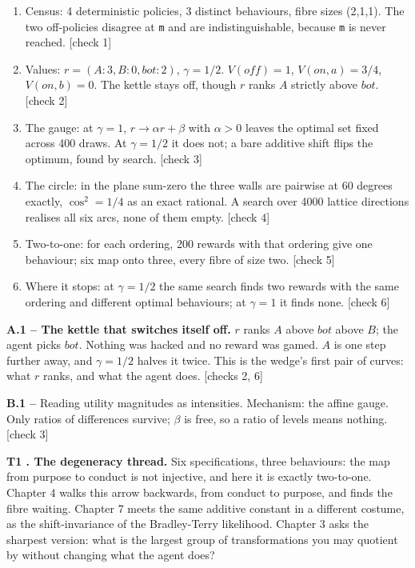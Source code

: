 \begin{enumerate}
\item Census: 4 deterministic policies, 3 distinct behaviours, fibre sizes (2,1,1). The two off-policies disagree at \texttt{m} and are indistinguishable, because \texttt{m} is never reached. [check 1]
\item Values: $r = (A:3, B:0, bot:2)$, $\gamma = 1/2$. $V(off) = 1$, $V(on,a) = 3/4$, $V(on,b) = 0$. The kettle stays off, though $r$ ranks $A$ strictly above $bot$. [check 2]
\item The gauge: at $\gamma = 1$, $r \to \alpha r + \beta$ with $\alpha > 0$ leaves the optimal set fixed across 400 draws. At $\gamma = 1/2$ it does not; a bare additive shift flips the optimum, found by search. [check 3]
\item The circle: in the plane sum-zero the three walls are pairwise at 60 degrees exactly, $\cos^2 = 1/4$ as an exact rational. A search over 4000 lattice directions realises all six arcs, none of them empty. [check 4]
\item Two-to-one: for each ordering, 200 rewards with that ordering give one behaviour; six map onto three, every fibre of size two. [check 5]
\item Where it stops: at $\gamma = 1/2$ the same search finds two rewards with the same ordering and different optimal behaviours; at $\gamma = 1$ it finds none. [check 6]
\end{enumerate}


\textbf{A.1 -- The kettle that switches itself off.} $r$ ranks $A$ above $bot$ above $B$; the agent picks $bot$. Nothing was hacked and no reward was gamed. $A$ is one step further away, and $\gamma = 1/2$ halves it twice. This is the wedge's first pair of curves: what $r$ ranks, and what the agent does. [checks 2, 6]

\textbf{B.1 --} Reading utility magnitudes as intensities. Mechanism: the affine gauge. Only ratios of differences survive; $\beta$ is free, so a ratio of levels means nothing. [check 3]

\textbf{T1 . The degeneracy thread.} Six specifications, three behaviours: the map from purpose to conduct is not injective, and here it is exactly two-to-one. Chapter 4 walks this arrow backwards, from conduct to purpose, and finds the fibre waiting. Chapter 7 meets the same additive constant in a different costume, as the shift-invariance of the Bradley-Terry likelihood. Chapter 3 asks the sharpest version: what is the largest group of transformations you may quotient by without changing what the agent does?

